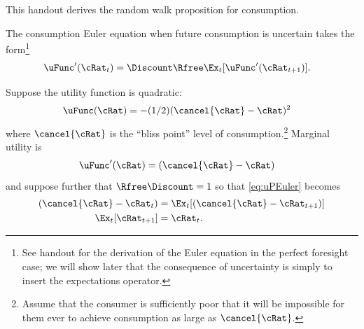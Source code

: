 
This handout derives the \cite{hallRandomWalk} random walk proposition for
consumption.

The consumption Euler equation when future consumption is uncertain
takes the form\footnote{See handout  for the derivation
of the Euler equation in the perfect foresight case; we will show later
that the consequence of uncertainty is simply to insert the
expectations operator.}
\begin{equation}\begin{gathered}\begin{aligned}
  \uFunc^{\prime}(\cRat_{t}) & =  \Discount \Rfree \Ex_{t}[\uFunc^{\prime}(\cRat_{t+1})]. \label{eq:uPEuler}
\end{aligned}\end{gathered}\end{equation}

Suppose the utility function is quadratic:
\begin{equation}\begin{gathered}\begin{aligned}
  \uFunc(\cRat) & =  -(1/2) (\cancel{\cRat}-\cRat)^{2}
\end{aligned}\end{gathered}\end{equation}
where $\cancel{\cRat}$ is the ``bliss point'' level of consumption.\footnote{Assume that the consumer
is sufficiently poor that it will be impossible for them ever to achieve consumption as large as $\cancel{\cRat}$.}  Marginal
utility is
\begin{equation}\begin{gathered}\begin{aligned}
  \uFunc^{\prime}(\cRat) & =   (\cancel{\cRat}-\cRat)
\end{aligned}\end{gathered}\end{equation}
and suppose further that $\Rfree \Discount = 1$ so that \eqref{eq:uPEuler} becomes
\begin{equation}\begin{gathered}\begin{aligned}
  (\cancel{\cRat}-\cRat_{t})  & =  \Ex_{t}[(\cancel{\cRat}-\cRat_{t+1})]
\\ \Ex_{t}[\cRat_{t+1}] & =  \cRat_{t}.
\end{aligned}\end{gathered}\end{equation}

